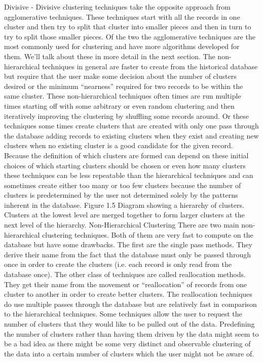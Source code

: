 Divisive - Divisive clustering techniques take the opposite approach from agglomerative techniques.  These techniques start with all the records in one cluster and then try to split that cluster into smaller pieces and then in turn to try to split those smaller pieces.  
Of the two the agglomerative techniques are the most commonly used for clustering and have more algorithms developed for them.  We’ll talk about these in more detail in the next section. The non-hierarchical techniques in general are faster to create from the historical database but require that the user make some decision about the number of clusters desired or the minimum “nearness” required for two records to be within the same cluster.  These non-hierarchical techniques often times are run multiple times starting off with some arbitrary or even random clustering and then iteratively improving the clustering by shuffling some records around.  Or these techniques some times create clusters that are created with only one pass through the database adding records to existing clusters when they exist and creating new clusters when no existing cluster is a good candidate for the given record. Because the definition of which clusters are formed can depend on these initial choices of which starting clusters should be chosen or even how many clusters these techniques can be less repeatable than the hierarchical techniques and can sometimes create either too many or too few clusters because the number of clusters is predetermined by the user not determined solely by the patterns inherent in the database.
Figure 1.5 Diagram showing a hierarchy of clusters.  Clusters at the lowest level are merged together to form larger clusters at the next level of the hierarchy.
Non-Hierarchical Clustering
There are two main non-hierarchical clustering techniques.  Both of them are very fast to compute on the database but have some drawbacks.  The first are the single pass methods.  They derive their name from the fact that the database must only be passed through once in order to create the clusters (i.e. each record is only read from the database once).  The other class of  techniques are called reallocation methods.  They get their name from the movement or “reallocation” of records from one cluster to another in order to create better clusters.  The reallocation techniques do use multiple passes through the database but are relatively fast in comparison to the hierarchical techniques.
Some techniques allow the user to request the number of clusters that they would like to be pulled out of the data.  Predefining the number of clusters rather than having them driven by the data might seem to be a bad idea as there might be some very distinct and observable clustering of the data into a certain number of clusters which the user might not be aware of. 
